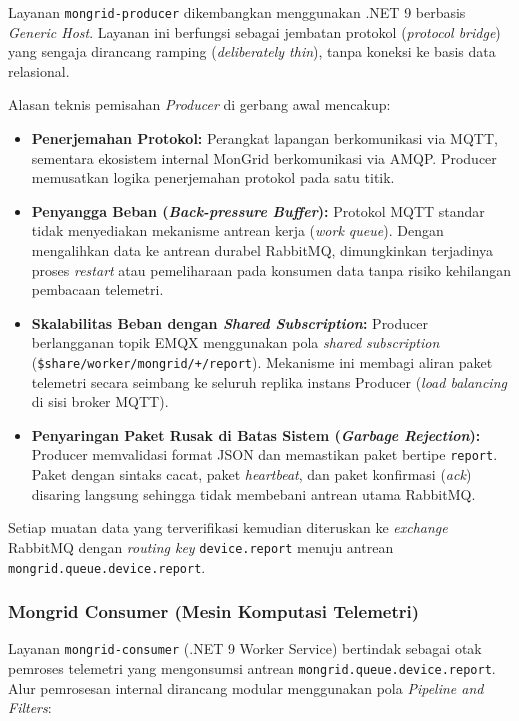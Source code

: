 Layanan \texttt{mongrid-producer} dikembangkan menggunakan .NET 9 berbasis \textit{Generic Host}. Layanan ini berfungsi sebagai jembatan protokol (\textit{protocol bridge}) yang sengaja dirancang ramping (\textit{deliberately thin}), tanpa koneksi ke basis data relasional.

Alasan teknis pemisahan \textit{Producer} di gerbang awal mencakup:
\begin{itemize}[leftmargin=*, itemsep=0pt]
  \item \textbf{Penerjemahan Protokol:} Perangkat lapangan berkomunikasi via MQTT, sementara ekosistem internal MonGrid berkomunikasi via AMQP. Producer memusatkan logika penerjemahan protokol pada satu titik.
  \item \textbf{Penyangga Beban (\textit{Back-pressure Buffer}):} Protokol MQTT standar tidak menyediakan mekanisme antrean kerja (\textit{work queue}). Dengan mengalihkan data ke antrean durabel RabbitMQ, dimungkinkan terjadinya proses \textit{restart} atau pemeliharaan pada konsumen data tanpa risiko kehilangan pembacaan telemetri.
  \item \textbf{Skalabilitas Beban dengan \textit{Shared Subscription}:} Producer berlangganan topik EMQX menggunakan pola \textit{shared subscription} (\texttt{\$share/worker/mongrid/+/report}). Mekanisme ini membagi aliran paket telemetri secara seimbang ke seluruh replika instans Producer (\textit{load balancing} di sisi broker MQTT).
  \item \textbf{Penyaringan Paket Rusak di Batas Sistem (\textit{Garbage Rejection}):} Producer memvalidasi format JSON dan memastikan paket bertipe \texttt{report}. Paket dengan sintaks cacat, paket \textit{heartbeat}, dan paket konfirmasi (\textit{ack}) disaring langsung sehingga tidak membebani antrean utama RabbitMQ.
\end{itemize}

Setiap muatan data yang terverifikasi kemudian diteruskan ke \textit{exchange} RabbitMQ dengan \textit{routing key} \texttt{device.report} menuju antrean \texttt{mongrid.queue.device.report}.

\subsubsection{Mongrid Consumer (Mesin Komputasi Telemetri)}

Layanan \texttt{mongrid-consumer} (.NET 9 Worker Service) bertindak sebagai otak pemroses telemetri yang mengonsumsi antrean \texttt{mongrid.queue.device.report}. Alur pemrosesan internal dirancang modular menggunakan pola \textit{Pipeline and Filters}:

